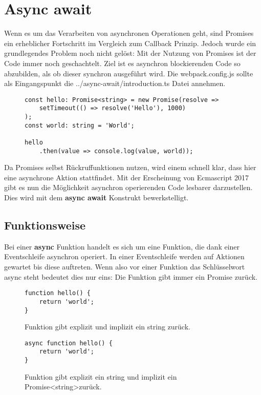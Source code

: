 \section{Async await}
Wenn es um das Verarbeiten von asynchronen Operationen geht, sind Promises ein erheblicher Fortschritt im Vergleich zum Callback Prinzip. Jedoch wurde ein grundlegendes Problem noch nicht gelöst: Mit der Nutzung von Promises ist der Code immer noch geschachtelt. Ziel ist es asynchron blockierenden Code so abzubilden, als ob dieser synchron ausgeführt wird. Die webpack.config.js sollte als Eingangspunkt die ../async-await/introduction.ts Datei annehmen.

\begin{figure}[H]
\begin{lstlisting}[basicstyle=\small]
const hello: Promise<string> = new Promise(resolve =>
    setTimeout(() => resolve('Hello'), 1000)
);
const world: string = 'World';

hello
    .then(value => console.log(value, world));
\end{lstlisting}
\end{figure}

\noindent
Da Promises selbst Rückruffunktionen nutzen, wird einem schnell klar, dass hier eine asynchrone Aktion stattfindet. Mit der Erscheinung von Ecmascript 2017 gibt es nun die Möglichkeit asynchron operierenden Code lesbarer darzustellen. Dies wird mit dem \textbf{async await} Konstrukt bewerkstelligt. 

\subsection{Funktionsweise}

Bei einer \textbf{async} Funktion handelt es sich um eine Funktion, die dank einer Eventschleife asynchron operiert. In einer Eventschleife werden auf Aktionen gewartet bis diese auftreten. Wenn also vor einer Funktion das Schlüsselwort async steht bedeutet dies nur eins: Die Funktion gibt immer ein Promise zurück.

\begin{figure}[H]
\begin{lstlisting}[basicstyle=\small]
function hello() {
    return 'world';
}
\end{lstlisting}
\caption{Funktion gibt explizit und implizit ein string zurück.}
\end{figure}

\begin{figure}[H]
\begin{lstlisting}[basicstyle=\small]
async function hello() {
    return 'world';
}
\end{lstlisting}
\caption{Funktion gibt explizit ein string und implizit ein Promise\textless string\textgreater zurück.}
\end{figure}

